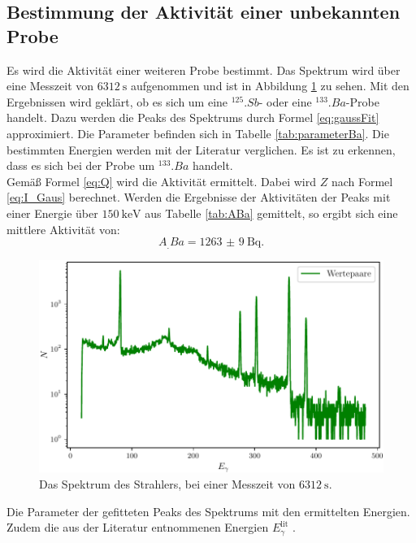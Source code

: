 \subsection{Bestimmung der Aktivität einer unbekannten Probe}

Es wird die Aktivität einer weiteren Probe bestimmt. Das Spektrum wird über eine Messzeit von $\SI{6312}{\second}$ aufgenommen und ist in Abbildung \ref{fig:Ba} zu sehen. Mit den Ergebnissen wird geklärt, ob es sich um eine $^{125}.{Sb}$- oder eine $^{133}.{Ba}$-Probe handelt.
Dazu werden die Peaks des Spektrums durch Formel \eqref{eq:gaussFit} approximiert. Die Parameter befinden sich in Tabelle \ref{tab:parameterBa}. Die bestimmten Energien werden mit der Literatur \cite{KHAZOV2011855} verglichen. Es ist zu erkennen, dass es sich bei der Probe um $^{133}.{Ba}$ handelt.\\
Gemäß Formel \eqref{eq:Q} wird die Aktivität ermittelt. Dabei wird $Z$ nach Formel \eqref{eq:I_Gaus} berechnet. Werden die Ergebnisse der Aktivitäten der Peaks mit einer Energie über $\SI{150}{\kilo\electronvolt}$ aus Tabelle \ref{tab:ABa} gemittelt, so ergibt sich eine mittlere Aktivität von:
\[
A_.{Ba} = \SI{1263(9)}{\becquerel}\text{.}
\]

\begin{figure}
	\centering
	\includegraphics[width=\linewidth-70pt,height=\textheight-70pt,keepaspectratio]{content/images/D.pdf}
	\caption{Das Spektrum des Strahlers, bei einer Messzeit von $\SI{6312}{\second}$.}
	\label{fig:Ba}
\end{figure}

\begin{table}
	\centering
	\caption{Die Parameter der gefitteten Peaks des Spektrums mit den ermittelten Energien. Zudem die aus der Literatur entnommenen Energien $E_\gamma^\text{lit}$ \cite{KHAZOV2011855}.}
	
	\label{tab:parameterBa}
\end{table}

